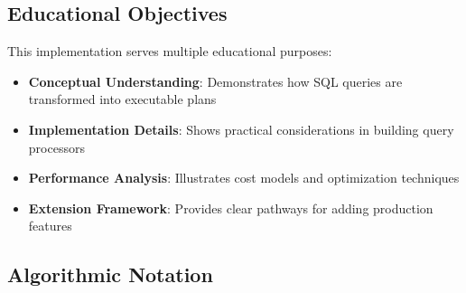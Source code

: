\documentclass[12pt,a4paper]{article}
\begin{document}
\subsection{Educational Objectives}

This implementation serves multiple educational purposes:

\begin{itemize}
    \item \textbf{Conceptual Understanding}: Demonstrates how SQL queries are transformed into executable plans
    \item \textbf{Implementation Details}: Shows practical considerations in building query processors
    \item \textbf{Performance Analysis}: Illustrates cost models and optimization techniques
    \item \textbf{Extension Framework}: Provides clear pathways for adding production features
\end{itemize}

\subsection{Algorithmic Notation}
\end{document}
